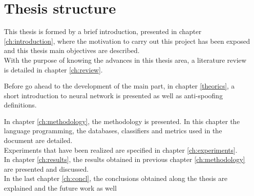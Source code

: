 \section{Thesis structure}
This thesis is formed by a brief introduction, presented in chapter \ref{ch:introduction}, where the motivation to carry out this project has been exposed and this thesis main objectives are described.\\

With the purpose of knowing the advances in this thesis area, a literature review is detailed in chapter \ref{ch:review}.

Before go ahead to the development of the main part, in chapter \ref{theorics}, a short introduction to neural network is presented as well as anti-spoofing definitions.

In chapter \ref{ch:methodology}, the methodology is presented. In this chapter the language programming, the databases, classifiers and metrics used in the document are detailed.\\

Experiments that have been realized are specified in chapter \ref{ch:experiments}.\\

In chapter \ref{ch:results}, the results obtained in previous chapter \ref{ch:methodology} are presented and discussed.\\

In the last chapter \ref{ch:concl}, the conclusions obtained along the thesis are explained and the future work as well\\
